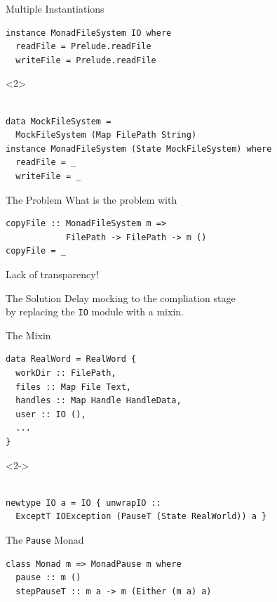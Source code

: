 \documentclass{beamer}
\begin{document}
\begin{frame}[fragile]{Multiple Instantiations}
\begin{verbatim}
instance MonadFileSystem IO where
  readFile = Prelude.readFile
  writeFile = Prelude.readFile
\end{verbatim}
\begin{visibleenv}<2>
\begin{verbatim}

data MockFileSystem =
  MockFileSystem (Map FilePath String)
instance MonadFileSystem (State MockFileSystem) where
  readFile = _
  writeFile = _
\end{verbatim}
\end{visibleenv}
\end{frame}

\begin{frame}[fragile]{The Problem}
What is the problem with
\begin{verbatim}
copyFile :: MonadFileSystem m =>
            FilePath -> FilePath -> m ()
copyFile = _
\end{verbatim}
\pause
\vfill
\begin{center}
  \alert{\Large Lack of transparency!}
\end{center}
\end{frame}

\begin{frame}{The Solution}
  \large
  Delay mocking to the compliation stage\\[1.5em]
  \pause
  \qquad by replacing the \texttt{IO} module with a mixin.
\end{frame}

\begin{frame}[fragile]{The Mixin}
\begin{verbatim}
data RealWord = RealWord {
  workDir :: FilePath,
  files :: Map File Text,
  handles :: Map Handle HandleData,
  user :: IO (),
  ...
}
\end{verbatim}
\begin{visibleenv}<2->
\begin{verbatim}

newtype IO a = IO { unwrapIO ::
  ExceptT IOException (PauseT (State RealWorld)) a }
\end{verbatim}
\end{visibleenv}
\end{frame}

\begin{frame}[fragile]{The \texttt{Pause} Monad}
\begin{verbatim}
class Monad m => MonadPause m where
  pause :: m ()
  stepPauseT :: m a -> m (Either (m a) a)
\end{verbatim}
\end{frame}
\end{document}
